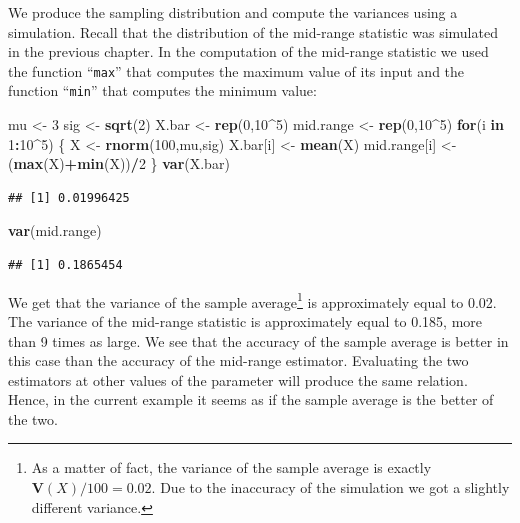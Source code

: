 \documentclass[
]{krantz}
\makeatletter
\newenvironment{Shaded}{\begin{snugshade}}{\end{snugshade}}
\newcommand{\ControlFlowTok}[1]{\textcolor[rgb]{0.13,0.29,0.53}{\textbf{#1}}}
\newcommand{\DecValTok}[1]{\textcolor[rgb]{0.00,0.00,0.81}{#1}}
\newcommand{\KeywordTok}[1]{\textcolor[rgb]{0.13,0.29,0.53}{\textbf{#1}}}
\newcommand{\NormalTok}[1]{#1}
\newcommand{\OperatorTok}[1]{\textcolor[rgb]{0.81,0.36,0.00}{\textbf{#1}}}
\newcommand{\StringTok}[1]{\textcolor[rgb]{0.31,0.60,0.02}{#1}}
\newcommand{\Var}{\mathbf{V}}
\newenvironment{kframe}{%
\medskip{}
\setlength{\fboxsep}{.8em}
 \def\at@end@of@kframe{}%
 \ifinner\ifhmode%
  \def\at@end@of@kframe{\end{minipage}}%
  \begin{minipage}{\columnwidth}%
 \fi\fi%
 \def\FrameCommand##1{\hskip\@totalleftmargin \hskip-\fboxsep
 \colorbox{shadecolor}{##1}\hskip-\fboxsep
     \hskip-\linewidth \hskip-\@totalleftmargin \hskip\columnwidth}%
 \MakeFramed {\advance\hsize-\width
   \@totalleftmargin\z@ \linewidth\hsize
   \@setminipage}}%
 {\par\unskip\endMakeFramed%
 \at@end@of@kframe}
\renewenvironment{Shaded}{\begin{kframe}}{\end{kframe}}
\theoremstyle{definition}
\theoremstyle{definition}
\theoremstyle{definition}
\theoremstyle{remark}
\makeatother
\begin{document}
We produce the sampling distribution and compute the variances using a
simulation. Recall that the distribution of the mid-range statistic was
simulated in the previous chapter. In the computation of the mid-range
statistic we used the function ``\texttt{max}'' that computes the maximum value
of its input and the function ``\texttt{min}'' that computes the minimum value:

\begin{Shaded}
\begin{Highlighting}[]
\NormalTok{mu <-}\StringTok{ }\DecValTok{3}
\NormalTok{sig <-}\StringTok{ }\KeywordTok{sqrt}\NormalTok{(}\DecValTok{2}\NormalTok{)}
\NormalTok{X.bar <-}\StringTok{ }\KeywordTok{rep}\NormalTok{(}\DecValTok{0}\NormalTok{,}\DecValTok{10}\OperatorTok{^}\DecValTok{5}\NormalTok{)}
\NormalTok{mid.range <-}\StringTok{ }\KeywordTok{rep}\NormalTok{(}\DecValTok{0}\NormalTok{,}\DecValTok{10}\OperatorTok{^}\DecValTok{5}\NormalTok{)}
\ControlFlowTok{for}\NormalTok{(i }\ControlFlowTok{in} \DecValTok{1}\OperatorTok{:}\DecValTok{10}\OperatorTok{^}\DecValTok{5}\NormalTok{) \{}
\NormalTok{  X <-}\StringTok{ }\KeywordTok{rnorm}\NormalTok{(}\DecValTok{100}\NormalTok{,mu,sig)}
\NormalTok{  X.bar[i] <-}\StringTok{ }\KeywordTok{mean}\NormalTok{(X)}
\NormalTok{  mid.range[i] <-}\StringTok{ }\NormalTok{(}\KeywordTok{max}\NormalTok{(X)}\OperatorTok{+}\KeywordTok{min}\NormalTok{(X))}\OperatorTok{/}\DecValTok{2}
\NormalTok{\}}
\KeywordTok{var}\NormalTok{(X.bar)}
\end{Highlighting}
\end{Shaded}

\begin{verbatim}
## [1] 0.01996425
\end{verbatim}

\begin{Shaded}
\begin{Highlighting}[]
\KeywordTok{var}\NormalTok{(mid.range)}
\end{Highlighting}
\end{Shaded}

\begin{verbatim}
## [1] 0.1865454
\end{verbatim}

We get that the variance of the sample average\footnote{As a matter of fact, the variance of the sample average is exactly
  \(\Var(X)/100 = 0.02\). Due to the inaccuracy of the simulation we got
  a slightly different variance.} is approximately
equal to 0.02. The variance of the mid-range statistic is approximately
equal to 0.185, more than 9 times as large. We see that the accuracy of
the sample average is better in this case than the accuracy of the
mid-range estimator. Evaluating the two estimators at other values of
the parameter will produce the same relation. Hence, in the current
example it seems as if the sample average is the better of the two.
\end{document}
